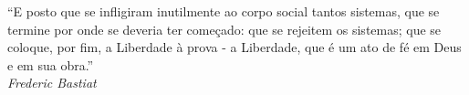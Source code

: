 \begin{titlepage}
 \vspace*{5cm}
 \begin{flushright}
  “E posto que se infligiram inutilmente ao corpo social tantos sistemas,
    que se termine por onde se deveria ter começado: que se rejeitem os
    sistemas; que se coloque, por fim, a Liberdade à prova - a Liberdade,
    que é um ato de fé em Deus e em sua obra.”\\\textit{Frederic Bastiat}
  \vspace{1cm}
 \end{flushright}
\end{titlepage}
